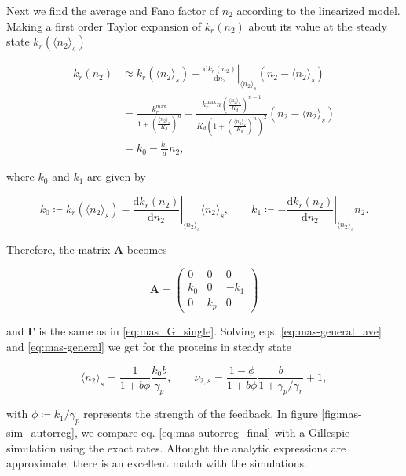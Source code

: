 Next we find the average and Fano factor of $n_2$ according to the linearized model. Making a first order Taylor expansion of $k_r(n_2)$ about its value at the steady state $k_r(\langle n_2\rangle_s)$

\begin{equation}
  \begin{split}
  k_r(n_2) &\approx k_r(\langle n_2\rangle_s) + \left.\frac{\mathrm{d}k_r(n_2)}{\mathrm{d}n_2}\right|_{\langle n_2\rangle_s}\left(n_2-\langle n_2\rangle_s\right)\\
  &=\frac{k_r^{\text{max}}}{1+\left(\frac{\langle n_2\rangle_s}{K_d}\right)^n} - \frac{k_r^{\text{max}}n\left(\frac{\langle n_2\rangle_s}{K_d}\right)^{n-1}}{K_d\left(1+\left(\frac{\langle n_2\rangle_s}{K_d}\right)^n\right)^2}\left(n_2-\langle n_2\rangle_s\right)\\
  &= k_0-\frac{k_1}{d}n_2,
  \end{split}
\end{equation} 

where $k_0$ and $k_1$ are given by

\begin{equation*}
  k_0\coloneqq k_r(\langle n_2\rangle_s) - \left.\frac{\mathrm{d}k_r(n_2)}{\mathrm{d}n_2}\right|_{\langle n_2\rangle_s}\langle n_2\rangle_s,\quad\quad k_1 \coloneqq -\left.\frac{\mathrm{d}k_r(n_2)}{\mathrm{d}n_2}\right|_{\langle n_2\rangle_s}n_2. 
\end{equation*}

Therefore, the matrix $\mathbf{A}$ becomes

\begin{equation*}
  \mathbf{A} =
  \begin{pmatrix}
    0 & 0 & 0 \\
    k_0 & 0 & -k_1 \\
    0 & k_p & 0
  \end{pmatrix}
\end{equation*}

and $\mathbf{\Gamma}$ is the same as in \eqref{eq:mas_G_single}. Solving eqs. \eqref{eq:mas-general_ave} and \eqref{eq:mas-general} we get for the proteins in steady state

\begin{equation}
  \label{eq:mas-autorreg_final}
  \langle n_2\rangle_s = \frac{1}{1+b\phi}\frac{k_0b}{\gamma_p},\quad\quad \nu_{2,s} = \frac{1-\phi}{1+b\phi}\frac{b}{1+\gamma_p/\gamma_r}+1,
\end{equation}

with $\phi\coloneqq k_1/\gamma_p$ represents the strength of the feedback. In figure \ref{fig:mas-sim_autorreg}, we compare eq. \eqref{eq:mas-autorreg_final}  with a Gillespie simulation using the exact rates. Altought the analytic expressions are approximate, there is an excellent match with the simulations.

